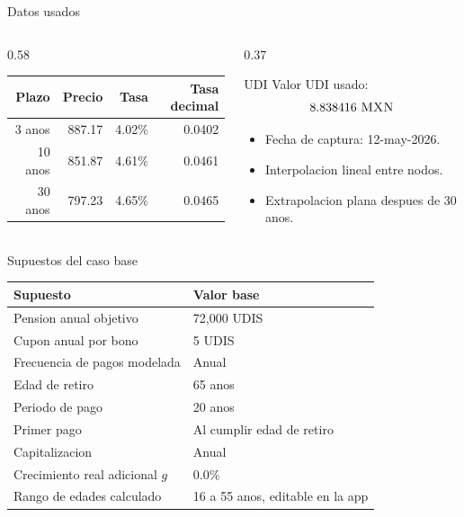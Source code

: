 \documentclass[aspectratio=169,11pt]{beamer}
\newcommand{\udis}{\textsc{UDIS}}
\newcommand{\mxn}{\textsc{MXN}}
\begin{document}
\begin{frame}{Datos usados}
  \begin{columns}[T]
    \begin{column}{0.58\textwidth}
      \begin{table}
      \centering
      \begin{tabular}{rrrr}
        \toprule
        Plazo & Precio & Tasa & Tasa decimal \\
        \midrule
        3 anos  & 887.17 & 4.02\% & 0.0402 \\
        10 anos & 851.87 & 4.61\% & 0.0461 \\
        30 anos & 797.23 & 4.65\% & 0.0465 \\
        \bottomrule
      \end{tabular}
      \end{table}
    \end{column}
    \begin{column}{0.37\textwidth}
      \begin{block}{UDI}
        \centering
        Valor UDI usado:
        \[
          8.838416\ \mxn
        \]
      \end{block}
      \begin{itemize}
        \item Fecha de captura: 12-may-2026.
        \item Interpolacion lineal entre nodos.
        \item Extrapolacion plana despues de 30 anos.
      \end{itemize}
    \end{column}
  \end{columns}
\end{frame}

\begin{frame}{Supuestos del caso base}
  \begin{table}
  \centering
  \begin{tabular}{ll}
    \toprule
    Supuesto & Valor base \\
    \midrule
    Pension anual objetivo & 72,000 \udis \\
    Cupon anual por bono & 5 \udis \\
    Frecuencia de pagos modelada & Anual \\
    Edad de retiro & 65 anos \\
    Periodo de pago & 20 anos \\
    Primer pago & Al cumplir edad de retiro \\
    Capitalizacion & Anual \\
    Crecimiento real adicional $g$ & 0.0\% \\
    Rango de edades calculado & 16 a 55 anos, editable en la app \\
    \bottomrule
  \end{tabular}
  \end{table}
\end{frame}
\end{document}
